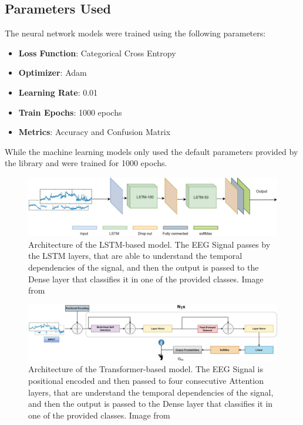 \subsection*{Parameters Used}
The neural network models were trained using the following parameters:
\begin{itemize}
    \item \textbf{Loss Function}: Categorical Cross Entropy
    \item \textbf{Optimizer}: Adam
    \item \textbf{Learning Rate}: 0.01
    \item \textbf{Train Epochs}: 1000 epochs
    \item \textbf{Metrics}: Accuracy and Confusion Matrix
\end{itemize}
While the machine learning models only used the default parameters provided by the library and were trained for 1000 epochs.
\begin{figure}[!htbp]
    \centering
        \centering    
        \includegraphics[width=\textwidth]{Figures/Methodology/LSTM}
        \caption{Architecture of the LSTM-based model.
        The EEG Signal passes by the LSTM layers, that are able to understand the temporal dependencies of the signal, and then the output is passed to the Dense layer that classifies it in one of the provided classes.
        Image from~\cite{sharma_deep_2023}}\label{fig:lstm_model}
\end{figure}
\begin{figure}[!htbp]
        \centering
        \includegraphics[width=\textwidth]{Figures/Methodology/Attention}
        \caption{Architecture of the Transformer-based model. 
        The EEG Signal is positional encoded and then passed to four consecutive Attention layers, that are understand the temporal dependencies of the signal, and then the output is passed to the Dense layer that classifies it in one of the provided classes.
        Image from~\cite{sharma_deep_2023}}\label{fig:attention_model}
\end{figure}


